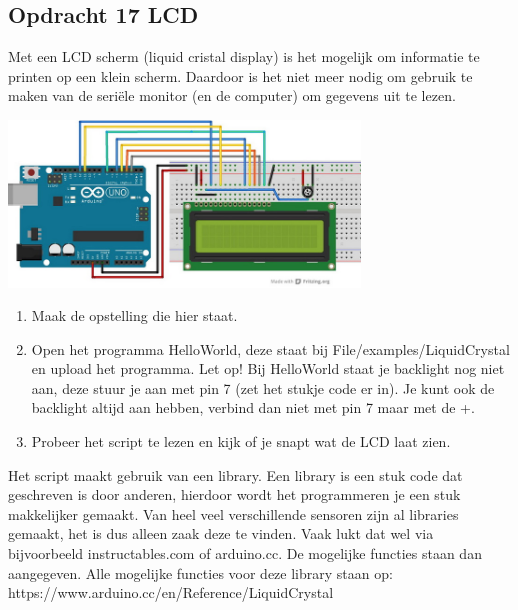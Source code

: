 \documentclass{arduino}
\begin{document}
\begin{minipage}{\widemargin}
\subsection{Opdracht 17 LCD}

Met een LCD scherm (liquid cristal display) is het mogelijk om informatie te printen op een klein scherm. Daardoor is het niet meer nodig om gebruik te maken van de seriële monitor (en de computer) om gegevens uit te lezen.\vspace{\baselineskip}

\begin{minipage}{\textwidth}
\centering
\includegraphics[width=0.7\textwidth]{37. Circuit display}
\end{minipage}

\begin{enumerate}[label={\alph*})]
\item Maak de opstelling die hier staat.

\item Open het programma HelloWorld, deze staat bij File/examples/LiquidCrystal en upload het programma. Let op! Bij HelloWorld staat je backlight nog niet aan, deze stuur je aan met pin 7 (zet het stukje code er in). Je kunt ook de backlight altijd aan hebben, verbind dan niet met pin 7 maar met de +.

\item Probeer het script te lezen en kijk of je snapt wat de LCD laat zien.
\end{enumerate}

Het script maakt gebruik van een library. Een library is een stuk code dat geschreven is door anderen, hierdoor wordt het programmeren je een stuk makkelijker gemaakt. Van heel veel verschillende sensoren zijn al libraries gemaakt, het is dus alleen zaak deze te vinden. Vaak lukt dat wel via bijvoorbeeld instructables.com of arduino.cc. De mogelijke functies staan dan aangegeven. Alle mogelijke functies voor deze library staan op: https://www.arduino.cc/en/Reference/LiquidCrystal


\end{minipage}
\end{document}
